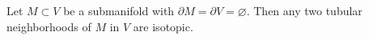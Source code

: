 Let $M \subset V$ be a submanifold with $\partial M = \partial V = \varnothing$. Then any two tubular neighborhoods of $M$ in $V$ are isotopic.
